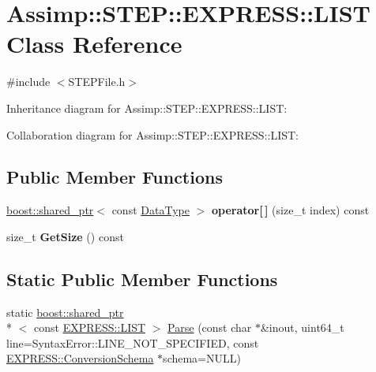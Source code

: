 \hypertarget{class_assimp_1_1_s_t_e_p_1_1_e_x_p_r_e_s_s_1_1_l_i_s_t}{\section{Assimp\+:\+:S\+T\+E\+P\+:\+:E\+X\+P\+R\+E\+S\+S\+:\+:L\+I\+S\+T Class Reference}
\label{class_assimp_1_1_s_t_e_p_1_1_e_x_p_r_e_s_s_1_1_l_i_s_t}
}


{\ttfamily \#include $<$S\+T\+E\+P\+File.\+h$>$}



Inheritance diagram for Assimp\+:\+:S\+T\+E\+P\+:\+:E\+X\+P\+R\+E\+S\+S\+:\+:L\+I\+S\+T\+:


Collaboration diagram for Assimp\+:\+:S\+T\+E\+P\+:\+:E\+X\+P\+R\+E\+S\+S\+:\+:L\+I\+S\+T\+:
\subsection*{Public Member Functions}
\begin{DoxyCompactItemize}
\item 
\hypertarget{class_assimp_1_1_s_t_e_p_1_1_e_x_p_r_e_s_s_1_1_l_i_s_t_a72669786e55002ec4afc8d51f25f9f61}{\hyperlink{classboost_1_1shared__ptr}{boost\+::shared\+\_\+ptr}$<$ const \hyperlink{class_assimp_1_1_s_t_e_p_1_1_e_x_p_r_e_s_s_1_1_data_type}{Data\+Type} $>$ {\bfseries operator\mbox{[}$\,$\mbox{]}} (size\+\_\+t index) const }\label{class_assimp_1_1_s_t_e_p_1_1_e_x_p_r_e_s_s_1_1_l_i_s_t_a72669786e55002ec4afc8d51f25f9f61}

\item 
\hypertarget{class_assimp_1_1_s_t_e_p_1_1_e_x_p_r_e_s_s_1_1_l_i_s_t_ae872f548b4604408f58fa5604645c2fc}{size\+\_\+t {\bfseries Get\+Size} () const }\label{class_assimp_1_1_s_t_e_p_1_1_e_x_p_r_e_s_s_1_1_l_i_s_t_ae872f548b4604408f58fa5604645c2fc}

\end{DoxyCompactItemize}
\subsection*{Static Public Member Functions}
\begin{DoxyCompactItemize}
\item 
static \hyperlink{classboost_1_1shared__ptr}{boost\+::shared\+\_\+ptr}\\*
$<$ const \hyperlink{class_assimp_1_1_s_t_e_p_1_1_e_x_p_r_e_s_s_1_1_l_i_s_t}{E\+X\+P\+R\+E\+S\+S\+::\+L\+I\+S\+T} $>$ \hyperlink{class_assimp_1_1_s_t_e_p_1_1_e_x_p_r_e_s_s_1_1_l_i_s_t_a6a03952131e15de2497976c51db4f600}{Parse} (const char $\ast$\&inout, uint64\+\_\+t line=Syntax\+Error\+::\+L\+I\+N\+E\+\_\+\+N\+O\+T\+\_\+\+S\+P\+E\+C\+I\+F\+I\+E\+D, const \hyperlink{class_assimp_1_1_s_t_e_p_1_1_e_x_p_r_e_s_s_1_1_conversion_schema}{E\+X\+P\+R\+E\+S\+S\+::\+Conversion\+Schema} $\ast$schema=N\+U\+L\+L)
\end{DoxyCompactItemize}
